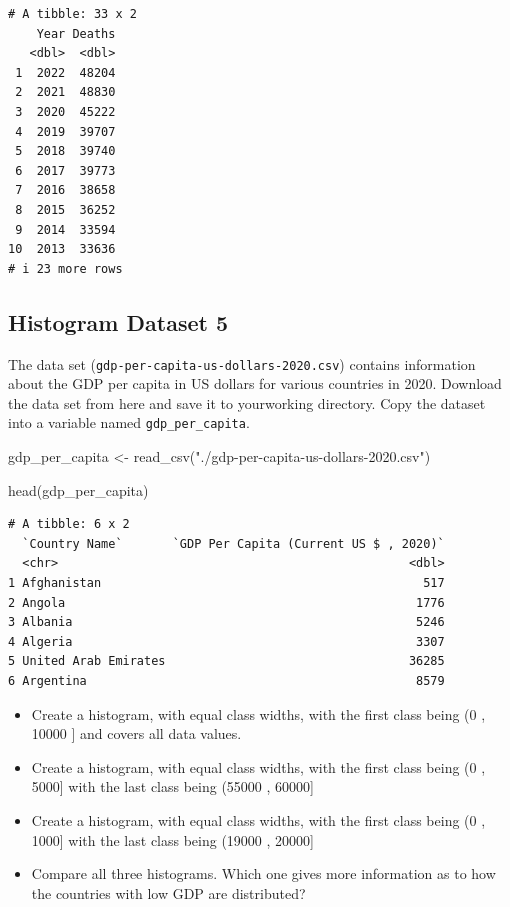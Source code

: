 \documentclass[
  letterpaper,
  DIV=11,
  numbers=noendperiod]{scrreprt}
\newenvironment{Shaded}{\begin{snugshade}}{\end{snugshade}}
\newcommand{\FunctionTok}[1]{\textcolor[rgb]{0.28,0.35,0.67}{#1}}
\newcommand{\NormalTok}[1]{\textcolor[rgb]{0.00,0.23,0.31}{#1}}
\newcommand{\OtherTok}[1]{\textcolor[rgb]{0.00,0.23,0.31}{#1}}
\newcommand{\StringTok}[1]{\textcolor[rgb]{0.13,0.47,0.30}{#1}}
\providecommand{\tightlist}{%
  \setlength{\itemsep}{0pt}\setlength{\parskip}{0pt}}\usepackage{longtable,booktabs,array}
\begin{document}
\begin{verbatim}
# A tibble: 33 x 2
    Year Deaths
   <dbl>  <dbl>
 1  2022  48204
 2  2021  48830
 3  2020  45222
 4  2019  39707
 5  2018  39740
 6  2017  39773
 7  2016  38658
 8  2015  36252
 9  2014  33594
10  2013  33636
# i 23 more rows
\end{verbatim}

\subsection*{Histogram Dataset 5}\label{histogram-dataset-5}

The data set (\texttt{gdp-per-capita-us-dollars-2020.csv}) contains
information about the GDP per capita in US dollars for various countries
in 2020. Download the data set from here and save it to yourworking
directory. Copy the dataset into a variable named
\texttt{gdp\_per\_capita}.

\begin{Shaded}
\begin{Highlighting}[]
\NormalTok{gdp\_per\_capita }\OtherTok{\textless{}{-}} \FunctionTok{read\_csv}\NormalTok{(}\StringTok{"./gdp{-}per{-}capita{-}us{-}dollars{-}2020.csv"}\NormalTok{)}

\FunctionTok{head}\NormalTok{(gdp\_per\_capita)}
\end{Highlighting}
\end{Shaded}

\begin{verbatim}
# A tibble: 6 x 2
  `Country Name`       `GDP Per Capita (Current US $ , 2020)`
  <chr>                                                 <dbl>
1 Afghanistan                                             517
2 Angola                                                 1776
3 Albania                                                5246
4 Algeria                                                3307
5 United Arab Emirates                                  36285
6 Argentina                                              8579
\end{verbatim}

\begin{itemize}
\tightlist
\item
  Create a histogram, with equal class widths, with the first class
  being (0 , 10000 {]} and covers all data values.
\item
  Create a histogram, with equal class widths, with the first class
  being (0 , 5000{]} with the last class being (55000 , 60000{]}
\item
  Create a histogram, with equal class widths, with the first class
  being (0 , 1000{]} with the last class being (19000 , 20000{]}
\item
  Compare all three histograms. Which one gives more information as to
  how the countries with low GDP are distributed?
\end{itemize}
\end{document}
